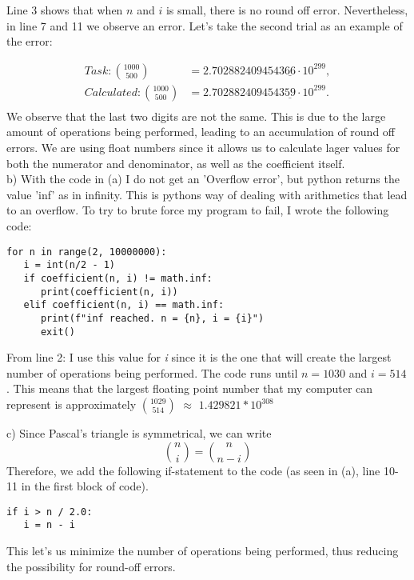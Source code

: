 \documentclass[11pt,
				a4paper,
				article,
				oneside,
				oldfontcommands]{memoir}
\begin{document}
Line 3 shows that when $n$ and $i$ is small, there is no round off error. Nevertheless, in line 7 and 11 we observe an error. Let's take the second trial as an example of the error:

\begin{align*}
	Task: \binom{1000}{500} &=  2.7028824094543\underline{66} \cdot 10^{299},\\[3pt]
	Calculated: \binom{1000}{500} &=  2.7028824094543\underline{59} \cdot 10^{299}.\\[3pt]
\end{align*}
We observe that the last two digits are not the same. This is due to the large amount of operations being performed, leading to an accumulation of round off errors. We are using float numbers since it allows us to calculate lager values for both the numerator and denominator, as well as the coefficient itself. \\

b) With the code in (a) I do not get an 'Overflow error', but python returns the value 'inf' as in infinity. This is pythons way of dealing with arithmetics that lead to an overflow. To try to brute force my program to fail, I wrote the following code: 
\begin{lstlisting}
for n in range(2, 10000000):
   i = int(n/2 - 1)
   if coefficient(n, i) != math.inf:
      print(coefficient(n, i))
   elif coefficient(n, i) == math.inf:
      print(f"inf reached. n = {n}, i = {i}")
      exit()
\end{lstlisting}

From line 2: I use this value for \textit{i} since it is the one that will create the largest number of operations being performed. The code runs until $n=1030$ and $i=514$. This means that the largest floating point number that my computer can represent is approximately $\binom{1029}{514}$ $\approx$ $1.429821*10^{308}$
\linebreak

c) Since Pascal's triangle is symmetrical, we can write
\begin{displaymath}
	\binom{n}{i} = \binom{n}{n - i}
\end{displaymath}
Therefore, we add the following if-statement to the code (as seen in (a), line 10-11 in the first block of code). 
\begin{lstlisting}
if i > n / 2.0:
   i = n - i
\end{lstlisting}
This let's us minimize the number of operations being performed, thus reducing the possibility for round-off errors.
\end{document}
